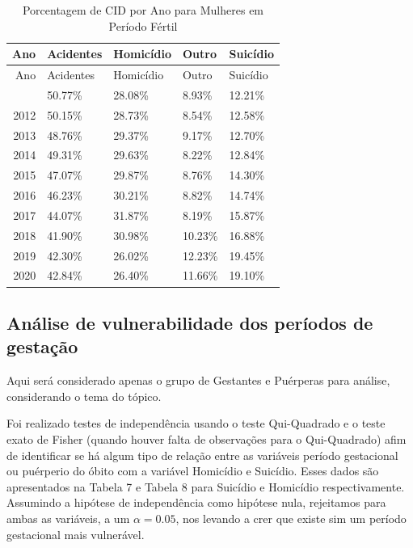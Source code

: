 \documentclass[
]{article}
\begin{document}
\begin{longtable}[]{@{}rllll@{}}
\caption{Porcentagem de CID por Ano para Mulheres em Período
Fértil}\tabularnewline
\toprule\noalign{}
Ano & Acidentes & Homicídio & Outro & Suicídio \\
\midrule\noalign{}
\endfirsthead
\toprule\noalign{}
Ano & Acidentes & Homicídio & Outro & Suicídio \\
\midrule\noalign{}
\endhead
\bottomrule\noalign{}
\endlastfoot
2011 & 50.77\% & 28.08\% & 8.93\% & 12.21\% \\
2012 & 50.15\% & 28.73\% & 8.54\% & 12.58\% \\
2013 & 48.76\% & 29.37\% & 9.17\% & 12.70\% \\
2014 & 49.31\% & 29.63\% & 8.22\% & 12.84\% \\
2015 & 47.07\% & 29.87\% & 8.76\% & 14.30\% \\
2016 & 46.23\% & 30.21\% & 8.82\% & 14.74\% \\
2017 & 44.07\% & 31.87\% & 8.19\% & 15.87\% \\
2018 & 41.90\% & 30.98\% & 10.23\% & 16.88\% \\
2019 & 42.30\% & 26.02\% & 12.23\% & 19.45\% \\
2020 & 42.84\% & 26.40\% & 11.66\% & 19.10\% \\
\end{longtable}

\hypertarget{anuxe1lise-de-vulnerabilidade-dos-peruxedodos-de-gestauxe7uxe3o}{%
\subsection{Análise de vulnerabilidade dos períodos de
gestação}\label{anuxe1lise-de-vulnerabilidade-dos-peruxedodos-de-gestauxe7uxe3o}}

Aqui será considerado apenas o grupo de Gestantes e Puérperas para
análise, considerando o tema do tópico.

Foi realizado testes de independência usando o teste Qui-Quadrado e o
teste exato de Fisher (quando houver falta de observações para o
Qui-Quadrado) afim de identificar se há algum tipo de relação entre as
variáveis período gestacional ou puérperio do óbito com a variável
Homicídio e Suicídio. Esses dados são apresentados na Tabela 7 e Tabela
8 para Suicídio e Homicídio respectivamente. Assumindo a hipótese de
independência como hipótese nula, rejeitamos para ambas as variáveis, a
um \(\alpha = 0.05\), nos levando a crer que existe sim um período
gestacional mais vulnerável.
\end{document}
